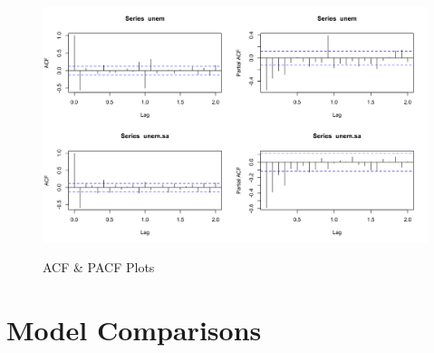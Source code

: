      \begin{figure}[H]
      	\centering
      	\caption{ACF \& PACF Plots}
      	\includegraphics[width=\linewidth]{images/acfpacf}
      	\label{fig:secdiff2}
      \end{figure}

    \section{Model Comparisons}
    
